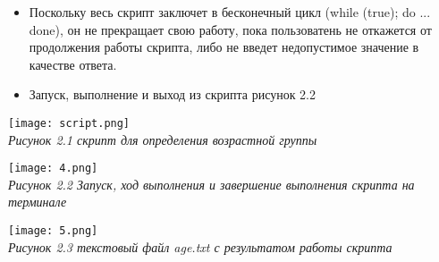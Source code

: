 \begin{itemize}
	\item
	Поскольку весь скрипт заключет в бесконечный цикл (while (true); do ... done), он не прекращает свою работу, пока пользоватень не откажется от продолжения работы скрипта, либо не введет недопустимое значение в качестве ответа.\\
	\item
	Запуск, выполнение и выход из скрипта рисунок 2.2\\
	\end{itemize}

\vspace{1cm}
	
\begin{center}
	\texttt{[image: script.png]}
	\\
	\textit{Рисунок 2.1 скрипт для определения возрастной группы}	
	\\
\end{center}
	
\begin{center}
	\texttt{[image: 4.png]}
	\\
	\textit{Рисунок 2.2 Запуск, ход выполнения и завершение выполнения скрипта на терминале}
	\\	
\end{center}
	
\begin{center}
	\texttt{[image: 5.png]}
	\\
	\textit{Рисунок 2.3 текстовый файл age.txt с результатом работы скрипта}
	\\	
\end{center}
	

	
	